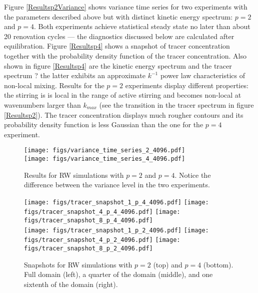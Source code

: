 \documentclass[11pt]{article}
\begin{document}
Figure \eqref{Resultsp2Variance} shows  variance time series for two experiments with the parameters described above but with distinct kinetic energy spectrum: $p=2$ and $p=4$. Both experiments achieve statistical steady state  no later than about 20 renovation cycles --- the diagnostics discussed below are calculated after equilibration. Figure \ref{Resultsp4} shows a snapshot of tracer concentration together with the probability density function of the tracer concentration. Also shown in figure
  \ref{Resultsp4} are the kinetic energy spectrum and the tracer spectrum ? the latter exhibits an approximate $k^{-1}$ power law characteristics of non-local mixing. Results for the $p=2$ experiments display different properties: the stirring is is local in the range of active stirring and becomes non-local at wavenumbers larger than $k_{max}$ (see the transition in the tracer spectrum in figure \ref{Resultsp2}). The tracer concentration displays much rougher contours and its probability density function is less Gaussian than the one for the $p=4$ experiment.

\begin{figure}[ht]
    \centering
            \texttt{[image: figs/variance\_time\_series\_2\_4096.pdf]}\\
                        \texttt{[image: figs/variance\_time\_series\_4\_4096.pdf]}
       \caption{\small Results for RW simulations with $p=2$ and $p=4$. Notice the difference between
       			       the variance level in the two experiments.}
		    \label{Resultsp2Variance}
\end{figure}

\begin{figure}[ht]
    \centering
            \texttt{[image: figs/tracer\_snapshot\_1\_p\_4\_4096.pdf]}
            \texttt{[image: figs/tracer\_snapshot\_4\_p\_4\_4096.pdf]}
            \texttt{[image: figs/tracer\_snapshot\_8\_p\_4\_4096.pdf]}\\
            \texttt{[image: figs/tracer\_snapshot\_1\_p\_2\_4096.pdf]}
            \texttt{[image: figs/tracer\_snapshot\_4\_p\_2\_4096.pdf]}
            \texttt{[image: figs/tracer\_snapshot\_8\_p\_2\_4096.pdf]}
       \caption{\small Snapshots for RW simulations with $p=2$ (top) and $p=4$ (bottom). Full domain (left), a quarter of the domain (middle),
       and one sixtenth of the domain (right).}
		    \label{Snapshotsp2p4}
\end{figure}
\end{document}
